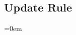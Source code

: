 \subsectionend
\subsection{Update Rule}
\label{ssec:update_rule}
\parindent=0em


\subsectionend

\sectionend




%


